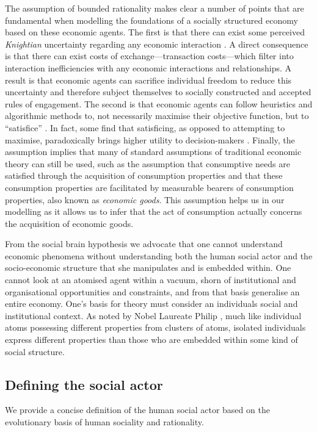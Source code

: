 The assumption of bounded rationality makes clear a number of points that are fundamental when modelling the foundations of a socially structured economy based on these economic agents. The first is that there can exist some perceived \emph{Knightian} uncertainty regarding any economic interaction \citep{Knight1921}. A direct consequence is that there can exist costs of exchange---transaction costs---which filter into interaction inefficiencies with any economic interactions and relationships. A result is that economic agents can sacrifice individual freedom to reduce this uncertainty and therefore subject themselves to socially constructed and accepted rules of engagement. The second is that economic agents can follow heuristics and algorithmic methods to, not necessarily maximise their objective function, but to ``satisfice'' \citep{Simon1947, Simon1956}. In fact, some find that satisficing, as opposed to attempting to maximise, paradoxically brings higher utility to decision-makers \citep{Schwartz2002}. Finally, the assumption implies that many of standard assumptions of traditional economic theory can still be used, such as the assumption that consumptive needs are satisfied through the acquisition of consumption properties and that these consumption properties are facilitated by measurable bearers of consumption properties, also known as \emph{economic goods}. This assumption helps us in our modelling as it allows us to infer that the act of consumption actually concerns the acquisition of economic goods.

From the social brain hypothesis we advocate that one cannot understand economic phenomena without understanding both the human social actor and the socio-economic structure that she manipulates and is embedded within. One cannot look at an atomised agent within a vacuum, shorn of institutional and organisational opportunities and constraints, and from that basis generalise an entire economy. One's basis for theory must consider an individuals social and institutional context. As noted by Nobel Laureate Philip \citet{Anderson1972}, much like individual atoms possessing different properties from clusters of atoms, isolated individuals express different properties than those who are embedded within some kind of social structure.

\subsection{Defining the social actor}

We provide a concise definition of the human social actor based on the evolutionary basis of human sociality and rationality.


